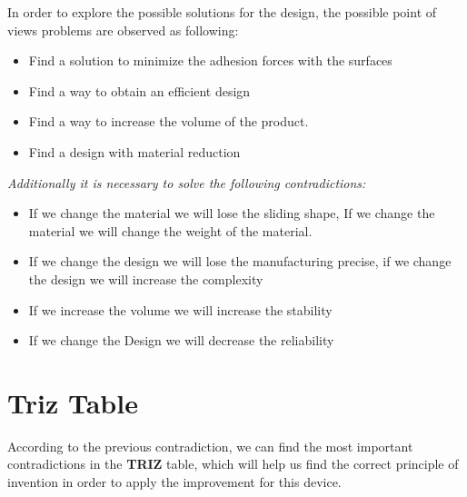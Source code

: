 \documentclass[12pt, twoside]{report}
\begin{document}
In order to explore the possible solutions for the design, the possible point of views problems are observed as following:\\
\begin{itemize}
    \item Find a solution to minimize the adhesion forces with the surfaces
    \item Find a way to obtain an efficient design
    \item Find a way to increase the volume of the product.
    \item Find a design with material reduction 
\end{itemize}
 \textit{Additionally it is necessary to solve the following contradictions:}
\begin{itemize}
    \item If we  change the material we will lose the sliding shape, If we change the material we will change the weight of the material.
    \item If we change the design we will lose the manufacturing precise, if we change the design we will increase the complexity
    \item If we increase the volume we will increase the stability
    \item If we change the Design we will decrease the reliability
\end{itemize}
 
\section{Triz Table}
According to the previous contradiction, we can find the most important contradictions in the \textbf{TRIZ} table, which will help us find the correct principle of invention in order to apply the improvement for this device.

\begin{table}
[H]\centering\setlength\tabcolsep{5.5pt}\renewcommand{}
  \noindent{}%
  \caption{First contradiction analysis}

\end{table}
\end{document}
